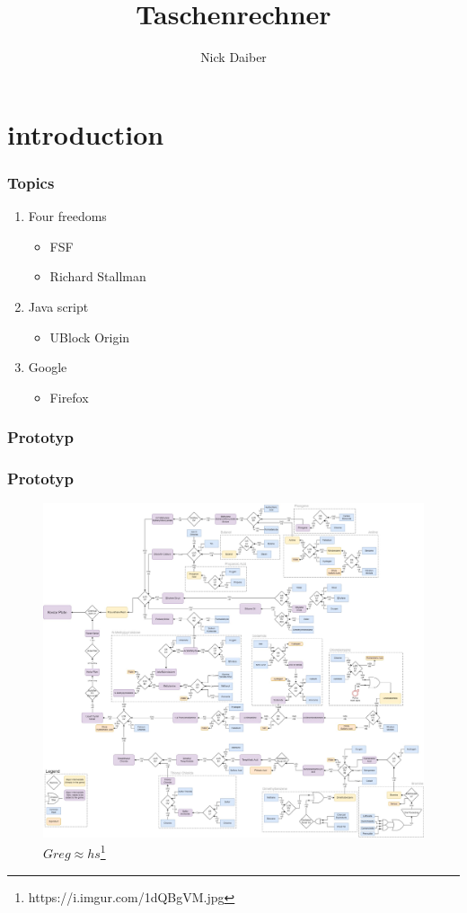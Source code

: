 \documentclass{beamer}
\author{Nick Daiber}
\title{Taschenrechner}
\begin{document}
\maketitle

\section{introduction}

\begin{frame}
  \frametitle{Topics}

  \begin{enumerate}
  \item Four freedoms
    \begin{itemize}
      \item FSF
    \item Richard Stallman
      \end{itemize}
  \item Java script
    \begin{itemize}
      \item UBlock Origin
      \end{itemize}
  \item Google
    \begin{itemize}
    \item Firefox
      \end{itemize}
  \end{enumerate}


\end{frame}

\begin{frame}
    \frametitle{Prototyp}
\end{frame}

\begin{frame}
    \frametitle{Prototyp}

\begin{figure}[h!]
    \includegraphics[width=0.75\linewidth]{Greg_hs.jpg}
    \caption{$Greg \approx hs$\footnote{https://i.imgur.com/1dQBgVM.jpg}}
    \end{figure}
\end{frame}
\end{document}
